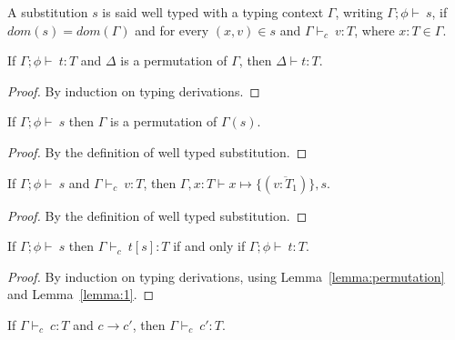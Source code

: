 \documentclass[preprint,authoryear,sort&compress,9pt,nocopyrightspace]{article}
\newcommand{\tto}{\longrightarrow}
\newcommand{\SubxD}{x \mapsto \{(\overline{v:T_1})\},s}
\newcommand{\tyC}{{\Gamma \vdash_c \ }}
\newcommand{\env}{{\Gamma ; \emt   \vdash \ }}
\newcommand{\emt}{\phi}
\begin{document}
\begin{definition}
\label{definition:wts}
\mbox{}
A substitution $s$ is said well typed with a typing context $\Gamma$, writing $\env s$, if $dom(s) = dom(\Gamma)$ and for every $(x,v) \in s$ and $\tyC v:T$, where $x:T \in \Gamma$.
\end{definition}

\begin{lemma}[Permutation]
\label{lemma:permutation}
\mbox{}
If $\env t : T$ and $\Delta$ is a permutation of $\Gamma$, then $\Delta \vdash t : T$.
\end{lemma}

\begin{proof}By induction on typing derivations.
\end{proof}

\begin{lemma}
\label{lemma:1}
\mbox{}
If $\env s$ then $\Gamma$ is a permutation of $\Gamma(s)$.
\end{lemma}

\begin{proof}By the definition of well typed substitution.
\end{proof}
\begin{lemma}
\label{lemma:2}
\mbox{}
If $\env s$ and $\tyC v : T$, then $\Gamma,x:T \vdash \SubxD$.
\end{lemma}

\begin{proof} By the definition of well typed substitution.\end{proof}

\begin{lemma}
\label{lemma:3}
\mbox{}
If $\env s$ then $\tyC t[s] : T$ if and only if $\env t:T$.
\end{lemma}

\begin{proof}By induction on typing derivations, using Lemma~\ref{lemma:permutation} and Lemma~\ref{lemma:1}.
\end{proof}


\begin{theorem}[Preservation]
\label{theorem:preservation}
\mbox{}
If $\tyC c : T$ and $c \tto c'$, then $\tyC c	' : T$.
\end{theorem}
\end{document}
